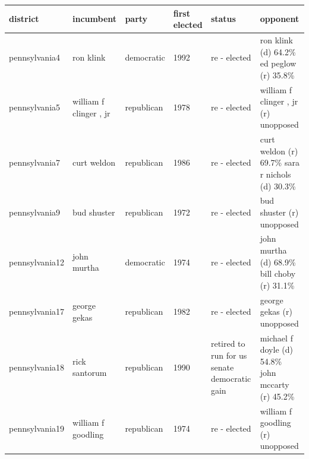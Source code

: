\documentclass{article}
\begin{document}
\begin{tabular}{llllll}
\toprule
district & incumbent & party & first elected & status & opponent \\
\midrule
pennsylvania4 & ron klink & democratic & 1992 & re - elected & ron klink (d) 64.2\% ed peglow (r) 35.8\% \\
pennsylvania5 & william f clinger , jr & republican & 1978 & re - elected & william f clinger , jr (r) unopposed \\
pennsylvania7 & curt weldon & republican & 1986 & re - elected & curt weldon (r) 69.7\% sara r nichols (d) 30.3\% \\
pennsylvania9 & bud shuster & republican & 1972 & re - elected & bud shuster (r) unopposed \\
pennsylvania12 & john murtha & democratic & 1974 & re - elected & john murtha (d) 68.9\% bill choby (r) 31.1\% \\
pennsylvania17 & george gekas & republican & 1982 & re - elected & george gekas (r) unopposed \\
pennsylvania18 & rick santorum & republican & 1990 & retired to run for us senate democratic gain & michael f doyle (d) 54.8\% john mccarty (r) 45.2\% \\
pennsylvania19 & william f goodling & republican & 1974 & re - elected & william f goodling (r) unopposed \\
\bottomrule
\end{tabular}
\end{document}
